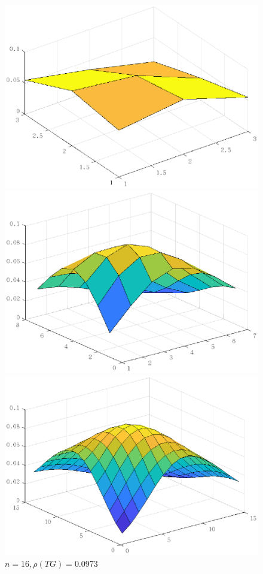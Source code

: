 \documentclass[lang=cn,10pt]{elegantbook}
\begin{document}
\begin{figure}[H]
  \centering
  \begin{minipage}[t]{0.24\linewidth}
      \centering
      \includegraphics[width=0.9\linewidth]{figure/2-t-1.eps}
      \caption*{$n=8,\rho(TG)=0.0884$}
  \end{minipage}
  \hspace{1em}
  \begin{minipage}[t]{0.24\linewidth}
    \centering
    \includegraphics[width=0.9\linewidth]{figure/2-t-2.eps}
    \caption*{$n=16,\rho(TG)=0.0973$}
  \end{minipage}
  \hspace{1em}
  \begin{minipage}[t]{0.24\linewidth}
    \centering
    \includegraphics[width=0.9\linewidth]{figure/2-t-3.eps}

\end{minipage}
\end{figure}
\end{document}
